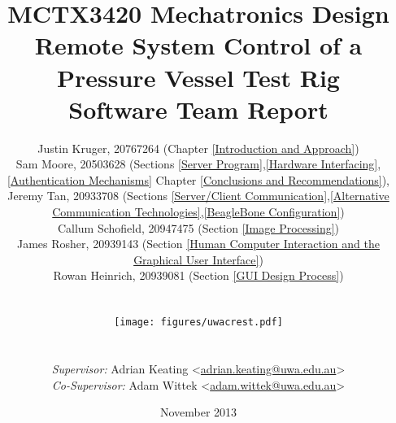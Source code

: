 \begin{titlepage}
\title{MCTX3420 Mechatronics Design\\Remote System Control of a Pressure Vessel Test Rig\\Software Team Report}
\author{Justin Kruger, 20767264 (Chapter \ref{Introduction and Approach})\\
		Sam Moore, 20503628 (Sections \ref{Server Program},\ref{Hardware Interfacing},\ref{Authentication Mechanisms} Chapter \ref{Conclusions and Recommendations}), \\
		Jeremy Tan, 20933708 (Sections \ref{Server/Client Communication},\ref{Alternative Communication Technologies},\ref{BeagleBone Configuration})\\
		Callum Schofield, 20947475 (Section \ref{Image Processing})\\
		James Rosher, 20939143 (Section \ref{Human Computer Interaction and the Graphical User Interface}) \\
		Rowan Heinrich, 20939081 (Section \ref{GUI Design Process}) \\ \\ \\
		\texttt{[image: figures/uwacrest.pdf]} \\ \\ \\
		\emph{Supervisor:} Adrian Keating <\href{mailto:adrian.keating@uwa.edu.au}{adrian.keating@uwa.edu.au}> \\
		\emph{Co-Supervisor:} Adam Wittek <\href{mailto:adam.wittek@uwa.edu.au}{adam.wittek@uwa.edu.au}>
}

\date{November 2013}

\maketitle
\centering

\end{titlepage}

